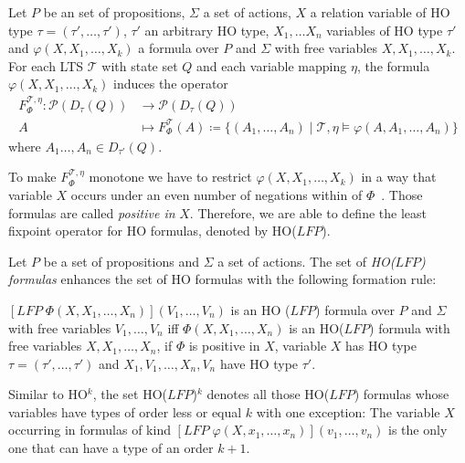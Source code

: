 \begin{definition}
\label{definition:induced_operator}
    Let $P$ be an set of propositions, $\Sigma$ a set of actions, $X$ a relation variable of HO type $\tau = (\tau', \dots, \tau')$,
    $\tau'$ an arbitrary HO type, $X_1, \dots X_n$ variables of HO type $\tau'$ and $\varphi(X, X_1, \dots, X_k)$ a
    formula over $P$ and $\Sigma$ with free variables $X, X_1, \dots, X_k$. For each LTS $\mathcal{T}$ with
    state set $Q$ and each variable mapping $\eta$, the formula $\varphi(X, X_1, \dots, X_k)$ induces the operator
    \begin{align*}
        F_\Phi^{\mathcal{T},\eta}\colon\mathscr{P}(D_\tau(Q)) &\longrightarrow \mathscr{P}(D_\tau(Q))\\
        A &\longmapsto F_\Phi^\mathcal{T}(A) \coloneqq \{(A_1, \dots, A_n) \mid \mathcal{T}, \eta \models \varphi(A, A_1,
        \dots, A_n)\}
    \end{align*}
    where $A_1 \dots, A_n \in D_{\tau'}(Q)$.
\end{definition}

To make $F_\Phi^{\mathcal{T}, \eta}$ monotone we have to restrict $\varphi(X, X_1, \dots, X_k)$ in a way that variable
$X$ occurs under an even number of negations within of $\Phi$~\cite{freireMartins2011descriptive}. Those formulas
are called \textit{positive in} $X$. Therefore, we are able to define the least fixpoint operator for HO
formulas, denoted by HO($\mathit{LFP}$).

\begin{definition}
    Let $P$ be a set of propositions and $\Sigma$ a set of actions. The set of \emph{HO($\mathit{LFP}$) formulas} enhances the set of HO formulas with the
    following formation rule:
    \begin{compactitem}
        \item $[\mathit{LFP}\;\Phi(X, X_1, \dots, X_n)](V_1, \dots, V_n)$ is an HO
        ($\mathit{LFP}$) formula over $P$ and $\Sigma$ with free variables $V_1, \dots, V_n$ iff $\Phi(X, X_1, \dots, X_n)
        $ is an HO($\mathit{LFP}$) formula with free variables $X, X_1, \dots, X_n$, if $\Phi$ is positive in
        $X$, variable $X$ has HO type $\tau = (\tau', \dots, \tau')$ and $X_1, V_1, \dots, X_n, V_n$ have HO type $\tau'$.
    \end{compactitem}
\end{definition}

Similar to HO$^k$, the set HO($\mathit{LFP}$)$^k$ denotes all those HO($\mathit{LFP}$) formulas whose variables have types of
order less or equal $k$ with one exception: The variable $X$ occurring in formulas of kind $[\mathit{LFP}\;\varphi(X, x_1, \dots, x_n)](v_1, \dots, v_n)$ is the only one that can have a type of an order $k+1$.


